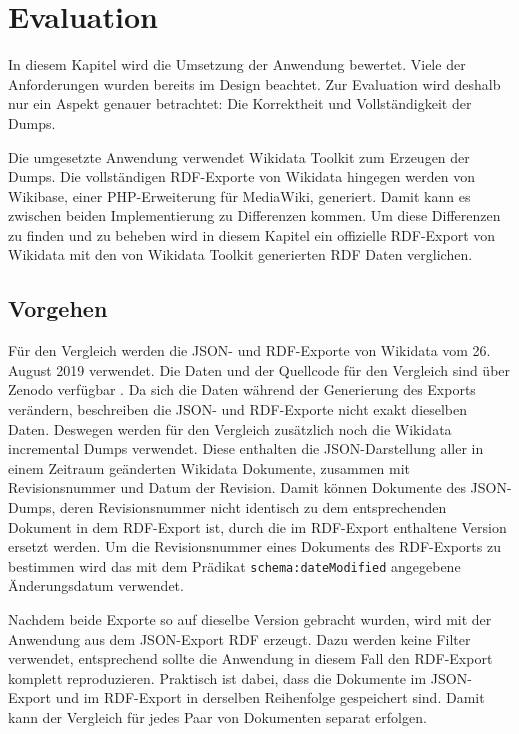 \chapter{Evaluation}
\label{chap:evaluation}
In diesem Kapitel wird die Umsetzung der Anwendung bewertet.
Viele der Anforderungen wurden bereits im Design beachtet.
Zur Evaluation wird deshalb nur ein Aspekt genauer betrachtet: Die Korrektheit und Vollständigkeit der Dumps.

Die umgesetzte Anwendung verwendet Wikidata Toolkit zum Erzeugen der Dumps.
Die vollständigen RDF-Exporte von Wikidata hingegen werden von Wikibase, einer PHP-Erweiterung für MediaWiki, generiert.
Damit kann es zwischen beiden Implementierung zu Differenzen kommen.
Um diese Differenzen zu finden und zu beheben wird in diesem Kapitel ein offizielle RDF-Export von Wikidata mit den von Wikidata Toolkit generierten RDF Daten verglichen. 

\section{Vorgehen}
Für den Vergleich werden die JSON- und RDF-Exporte von Wikidata vom 26. August 2019 verwendet.
Die Daten und der Quellcode für den Vergleich sind über Zenodo verfügbar \cite{zenodo-diff-data}.
Da sich die Daten während der Generierung des Exports verändern, beschreiben die JSON- und RDF-Exporte nicht exakt dieselben Daten.
Deswegen werden für den Vergleich zusätzlich noch die Wikidata incremental Dumps verwendet.
Diese enthalten die JSON-Darstellung aller in einem Zeitraum geänderten Wikidata Dokumente, zusammen mit Revisionsnummer und Datum der Revision. 
Damit können Dokumente des JSON-Dumps, deren Revisionsnummer nicht identisch zu dem entsprechenden Dokument in dem RDF-Export ist, durch die im RDF-Export enthaltene Version ersetzt werden.
Um die Revisionsnummer eines Dokuments des RDF-Exports zu bestimmen wird das mit dem Prädikat \verb|schema:dateModified| angegebene Änderungsdatum verwendet.

Nachdem beide Exporte so auf dieselbe Version gebracht wurden, wird mit der Anwendung aus dem JSON-Export RDF erzeugt.
Dazu werden keine Filter verwendet, entsprechend sollte die Anwendung in diesem Fall den RDF-Export komplett reproduzieren.
Praktisch ist dabei, dass die Dokumente im JSON-Export und im RDF-Export in derselben Reihenfolge gespeichert sind.
Damit kann der Vergleich für jedes Paar von Dokumenten separat erfolgen.

